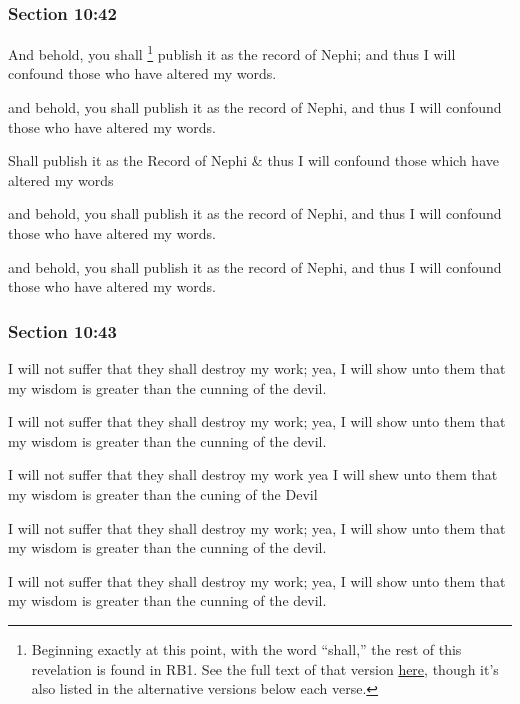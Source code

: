 	\subsubsection{Section 10:42} %
		\label{DC10-42}

		And behold, you shall%
			\footnote{%
				Beginning exactly at this point, with the word ``shall,'' the rest of this revelation is found in RB1. See the full text of that version \hyperref[EXSS-DC10-RB1]{here}, though it's also listed in the alternative versions below each verse.
				}
		publish it as the record of Nephi; and thus I will confound those who have altered my words.

		\begin{framed}
		\scriptsize
			\begin{compactdesc}
				\item[JSP] and behold, you shall publish it as the record of Nephi, and thus I will confound those who have altered my words.
				\item[RB1] Shall publish it as the Record of Nephi \& thus I will confound those which have altered my words
				\item[DC 1835] and behold, you shall publish it as the record of Nephi, and thus I will confound those who have altered my words.
				\item[DC 1844] and behold, you shall publish it as the record of Nephi, and thus I will confound those who have altered my words.
			\end{compactdesc}
		\end{framed}

	\subsubsection{Section 10:43} %
		\label{DC10-43}

		I will not suffer that they shall destroy my work; yea, I will show unto them that my wisdom is greater than the cunning of the devil.

		\begin{framed}
		\scriptsize
			\begin{compactdesc}
				\item[JSP] I will not suffer that they shall destroy my work; yea, I will show unto them that my wisdom is greater than the cunning of the devil.
				\item[RB1] I will not suffer that they shall destroy my work yea I will shew unto them that my wisdom is greater than the cuning of the Devil
				\item[DC 1835] I will not suffer that they shall destroy my work; yea, I will show unto them that my wisdom is greater than the cunning of the devil.
				\item[DC 1844] I will not suffer that they shall destroy my work; yea, I will show unto them that my wisdom is greater than the cunning of the devil.
			\end{compactdesc}
		\end{framed}

